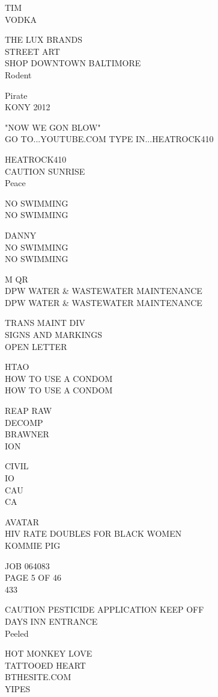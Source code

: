 \documentclass[10pt,letterpaper]{article}
\begin{document}
TIM\\
VODKA

THE LUX BRANDS\\
STREET ART\\
SHOP DOWNTOWN BALTIMORE\\
Rodent

Pirate\\
KONY 2012

"NOW WE GON BLOW"\\
GO TO...YOUTUBE.COM TYPE IN...HEATROCK410

HEATROCK410\\
CAUTION SUNRISE\\
Peace

NO SWIMMING\\
NO SWIMMING

DANNY\\
NO SWIMMING\\
NO SWIMMING

M QR\\
DPW WATER \& WASTEWATER MAINTENANCE\\
DPW WATER \& WASTEWATER MAINTENANCE

TRANS MAINT DIV\\
SIGNS AND MARKINGS\\
OPEN LETTER

HTAO\\
HOW TO USE A CONDOM\\
HOW TO USE A CONDOM

REAP RAW\\
DECOMP\\
BRAWNER\\
ION

CIVIL\\
IO\\
CAU\\
CA

AVATAR\\
HIV RATE DOUBLES FOR BLACK WOMEN\\
KOMMIE PIG

JOB 064083\\
PAGE 5 OF 46\\
433

CAUTION PESTICIDE APPLICATION KEEP OFF\\
DAYS INN ENTRANCE\\
Peeled

HOT MONKEY LOVE\\
TATTOOED HEART\\
BTHESITE.COM\\
YIPES
\end{document}
